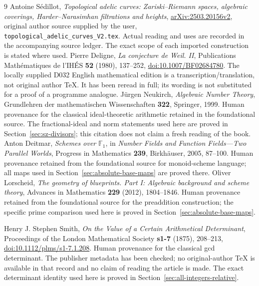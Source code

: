 \documentclass[11pt,a4paper]{article}
\theoremstyle{definition}\newtheorem{definition}[theorem]{Definition}
\begin{document}
\begin{thebibliography}{9}
 Antoine S\'edillot, \emph{Topological adelic curves: Zariski--Riemann spaces, algebraic coverings, Harder--Narasimhan filtrations and heights}, \href{https://arxiv.org/abs/2503.20156v2}{arXiv:2503.20156v2}, original author source supplied by the user, \texttt{topological\_adelic\_curves\_V2.tex}. Actual reading and uses are recorded in the accompanying source ledger. The exact scope of each imported construction is stated where used.
 Pierre Deligne, \emph{La conjecture de Weil. II}, Publications Math\'ematiques de l'IH\'ES \textbf{52} (1980), 137--252, \href{https://doi.org/10.1007/BF02684780}{doi:10.1007/BF02684780}. The locally supplied D032 English mathematical edition is a transcription/translation, not original author TeX. It has been reread in full; its wording is not substituted for a proof of a programme analogue.
 J\"urgen Neukirch, \emph{Algebraic Number Theory}, Grundlehren der mathematischen Wissenschaften \textbf{322}, Springer, 1999. Human provenance for the classical ideal-theoretic arithmetic retained in the foundational source. The fractional-ideal and norm statements used here are proved in Section~\ref{sec:sz-divisors}; this citation does not claim a fresh reading of the book.
 Anton Deitmar, \emph{Schemes over $\mathbb F_1$}, in \emph{Number Fields and Function Fields---Two Parallel Worlds}, Progress in Mathematics \textbf{239}, Birkh\"auser, 2005, 87--100. Human provenance retained from the foundational source for monoid-scheme language; all maps used in Section~\ref{sec:absolute-base-maps} are proved there.
 Oliver Lorscheid, \emph{The geometry of blueprints. Part I: Algebraic background and scheme theory}, Advances in Mathematics \textbf{229} (2012), 1804--1846. Human provenance retained from the foundational source for the preaddition construction; the specific prime comparison used here is proved in Section~\ref{sec:absolute-base-maps}.

Henry J. Stephen Smith, \emph{On the Value of a Certain Arithmetical Determinant},
Proceedings of the London Mathematical Society \textbf{s1-7} (1875), 208--213,
\href{https://doi.org/10.1112/plms/s1-7.1.208}{doi:10.1112/plms/s1-7.1.208}.
Human provenance for the classical gcd determinant. The publisher metadata
has been checked; no original-author TeX is available in that record and
no claim of reading the article is made. The exact determinant identity
used here is proved in Section~\ref{sec:all-integers-relative}.
\end{thebibliography}
\end{document}
